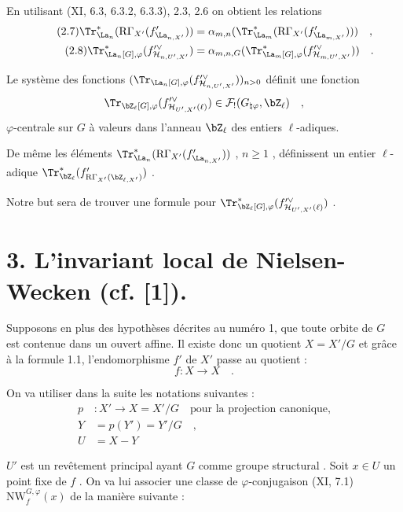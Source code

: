 En utilisant (XI, 6.3, 6.3.2, 6.3.3), 2.3, 2.6 on obtient les relations
\begin{align}
\tag{2.7} \Tr^*_{\La_n}(\mathrm{R}\Gamma_{X'}(f'_{\La_{n,X'}})) &= \alpha_{m,n}(\Tr^*_{\La_m}(\mathrm{R}\Gamma_{X'}(f'_{\La_{m,X'}}))) \quad , \\
\tag{2.8} \Tr^*_{\La_n[G],\varphi}(f'^\vee_{\mathcal{H}_{n,U',X'}}) &= \alpha_{m,n,G}(\Tr^*_{\La_m[G],\varphi}(f'^\vee_{\mathcal{H}_{m,U',X'}})) \quad .
\end{align}

Le système des fonctions $(\Tr_{\La_n[G],\varphi}(f'^\vee_{\mathcal{H}_{n,U',X'}}))_{n>0}$ définit une fonction
\[
\Tr_{\bZ_\ell[G],\varphi}(f'^\vee_{\mathcal{H}_{U',X'}(\ell)}) \in \mathcal{F}_!(G_{\natural\varphi}, \bZ_\ell) \quad ,
\]
$\varphi$-centrale sur $G$ à valeurs dans l'anneau $\bZ_\ell$ des entiers $\ell$-adiques.

De même les éléments $\Tr^*_{\La_n}(\mathrm{R}\Gamma_{X'}(f'_{\La_{n,X'}}))$ , $n \geq 1$ , définissent un entier $\ell$-adique $\Tr^*_{\bZ_\ell}(f'_{\mathrm{R}\Gamma_{X'}(\bZ_{\ell,X'})})$ .

Notre but sera de trouver une formule pour $\Tr^*_{\bZ_\ell[G],\varphi}(f'^\vee_{\mathcal{H}_{U',X'}(\ell)})$ .


\section*{3. L'invariant local de Nielsen-Wecken (cf. [1]).}
Supposons en plus des hypothèses décrites au numéro 1, que toute orbite de $G$ est contenue dans un ouvert affine. Il existe donc un quotient $X = X'/G$ et grâce à la formule 1.1, l'endomorphisme $f'$ de $X'$ passe au quotient :
\[
f : X \longrightarrow X \quad .
\]

On va utiliser dans la suite les notations suivantes :
\begin{align*}
p &: X' \longrightarrow X = X'/G \quad
\text{pour la projection canonique,} \\
Y &= p(Y') = Y'/G \quad , \\
U &= X - Y
\end{align*}

$U'$ est un revêtement principal ayant $G$ comme groupe structural . Soit $x \in U$ un point fixe de $f$ . On va lui associer une classe de $\varphi$-conjugaison (XI, 7.1) $\mathrm{NW}_{f}^{G,\varphi}(x)$ de la manière suivante :

